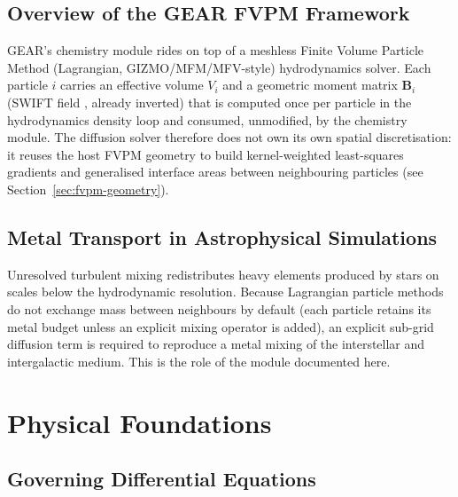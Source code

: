 \documentclass[11pt, a4paper, parskip]{scrartcl}
\newcommand{\code}[1]{\texttt{\seqsplit{#1}}}
\theoremstyle{plain}
\theoremstyle{definition}
\begin{document}
\subsection{Overview of the GEAR FVPM Framework}
GEAR's chemistry module rides on top of a meshless Finite Volume Particle
Method (Lagrangian, GIZMO/MFM/MFV-style) hydrodynamics solver. Each particle
$i$ carries an effective volume $V_i$ and a geometric moment matrix
$\mathbf{B}_i$ (SWIFT field \code{p->geometry.matrix\_E}, already inverted)
that is computed once per particle in the hydrodynamics density loop and
consumed, unmodified, by the chemistry module. The diffusion solver
therefore does not own its own spatial discretisation: it reuses the
host FVPM geometry to build kernel-weighted least-squares gradients and
generalised interface areas between neighbouring particles (see
Section~\ref{sec:fvpm-geometry}).

\subsection{Metal Transport in Astrophysical Simulations}
Unresolved turbulent mixing redistributes heavy elements produced by
stars on scales below the hydrodynamic resolution. Because Lagrangian
particle methods do not exchange mass between neighbours by default
(each particle retains its metal budget unless an explicit mixing
operator is added), an explicit sub-grid diffusion term is required to
reproduce a metal mixing of the interstellar and intergalactic medium.
This is the role of the module documented here.

\section{Physical Foundations}

\subsection{Governing Differential Equations}
\end{document}
